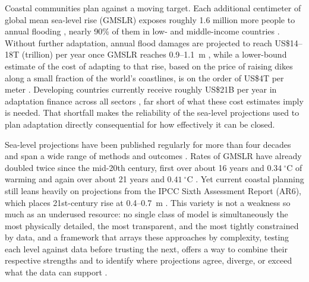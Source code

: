 \documentclass[12pt]{article}
\begin{document}
Coastal communities plan against a moving target. Each additional
centimeter of global mean sea-level rise (GMSLR) exposes roughly 1.6
million more people to annual flooding \citep{Kulp2019}, nearly 90\% of
them in low- and middle-income countries \citep{Jongman2012}. Without
further adaptation, annual flood damages are projected to reach
US\$14--18T (trillion) per year once GMSLR reaches 0.9--1.1~m
\citep{Jevrejeva2018}, while a lower-bound estimate of the cost of adapting
to that rise, based on the price of raising dikes along a small fraction of
the world's coastlines, is on the order of US\$4T per meter
\citep{Tiggeloven2020}. Developing countries currently receive roughly
US\$21B per year in adaptation finance across all sectors
\citep{UNEP2023}, far short of what these cost estimates imply is needed.
That shortfall makes the reliability of the sea-level projections used to
plan adaptation directly consequential for how effectively it can be
closed.

Sea-level projections have been published regularly for more than four
decades and span a wide range of methods and outcomes \citep{Garner2026}.
Rates of GMSLR have already doubled twice since the mid-20th century,
first over about 16 years and $0.34\ ^\circ$C of warming and again over
about 21 years and $0.41\ ^\circ$C \citep{Frederikse2020,Hamlington2024,
Rohde2020}. Yet current coastal planning still leans heavily on
projections from the IPCC Sixth Assessment Report (AR6), which places
21st-century rise at 0.4--0.7~m \citep{Fox-Kemper2021,Hirschfeld2023}.
This variety is not a weakness so much as an underused resource: no single
class of model is simultaneously the most physically detailed, the most
transparent, and the most tightly constrained by data, and a framework
that arrays these approaches by complexity, testing each level against data
before trusting the next, offers a way to combine their respective
strengths and to identify where projections agree, diverge, or exceed what
the data can support \citep{Green2015,Makridakis2020}.
\end{document}
